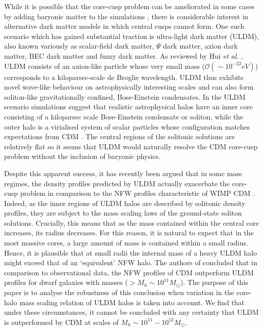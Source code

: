 \documentclass[a4paper,11pt]{article}
\begin{document}
While it is possible that the core-cusp problem can be ameliorated in some cases by adding baryonic matter to the simulations  \cite{Benitez-Llambay:2018}, there is considerable interest in alternative dark matter models in which central cusps cannot form.  One such scenario which has gained substantial traction is ultra-light dark matter (ULDM), also known variously as scalar-field dark matter, $\Psi$ dark matter, axion dark matter, BEC dark matter and fuzzy dark matter. As reviewed by Hui {\em et al.\/} \cite{Hui:2016ltb}, ULDM consists of an axion-like particle whose very small mass  ($\mathcal{O}(\sim 10^{-22}eV)$) corresponds to a kiloparsec-scale de Broglie wavelength.  ULDM thus exhibits novel wave-like behaviour on astrophysically interesting scales and can also form soliton-like gravitationally confined, Bose-Einstein condensates. In the ULDM scenario simulations  \cite{Veltmaat:2018dfz} suggest that realistic astrophysical halos have an inner core consisting of a kiloparsec scale Bose-Einstein condensate or soliton, while the outer halo is a virialised system of scalar particles whose configuration matches expectations from CDM \cite{Schwabe:2016rze}. The central regions of the solitonic solutions are relatively flat so it seems that ULDM would naturally resolve the CDM core-cusp problem without the inclusion of baryonic physics. 

Despite this apparent success, it has recently been argued that in some mass regimes, the density profiles predicted by ULDM actually exacerbate the core-cusp problem in comparison to the NFW profiles characteristic of WIMP CDM \cite{Robles:2018fur}. Indeed, as the inner regions of ULDM halos are described by solitonic density profiles, they are subject to the mass scaling laws of the ground-state soliton solutions. Crucially, this means that as the mass contained within the central core increases, its radius decreases. For this reason, it is natural to expect that in the most massive cores, a large amount of mass is contained within a small radius. Hence, it is plausible that at small radii the internal mass of a heavy ULDM halo might exceed that of an `equivalent' NFW halo. The authors of \cite{Robles:2018fur} concluded that in comparison to observational data, the NFW profiles of CDM outperform ULDM profiles for dwarf galaxies with masses ($> M_h \sim 10^{11} M_{\odot}$). The purpose of this paper is to analyse the robustness of this conclusion when variation in the core-halo mass scaling relation of ULDM halos is taken into account. We find that under these circumstances, it cannot be concluded with any certainty that ULDM is outperformed by CDM at scales of $M_h \sim 10^{11}-10^{12} M_{\odot}$.
\end{document}
